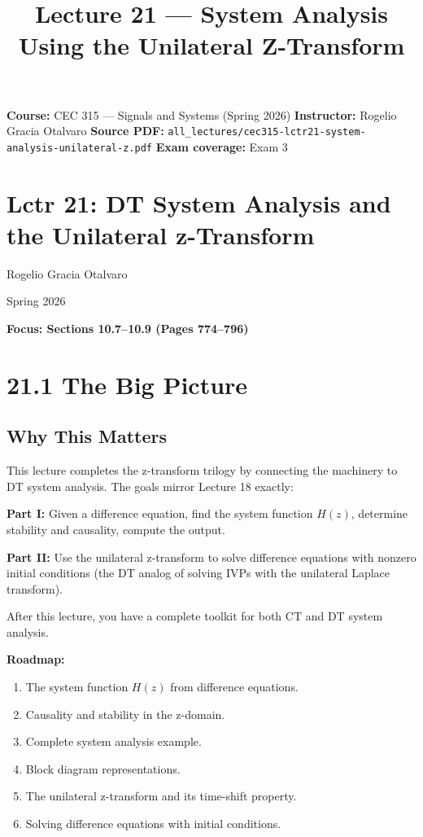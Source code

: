\documentclass[11pt]{article}
\title{Lecture 21 — System Analysis Using the Unilateral Z-Transform}
\author{}
\date{}
\begin{document}
\maketitle

\textbf{Course:} CEC 315 — Signals and Systems (Spring 2026)
\textbf{Instructor:} Rogelio Gracia Otalvaro
\textbf{Source PDF:} \texttt{all\_lectures/cec315-lctr21-system-analysis-unilateral-z.pdf}
\textbf{Exam coverage:} Exam 3

\section*{Lctr 21: DT System Analysis and the Unilateral z-Transform}

Rogelio Gracia Otalvaro

Spring 2026

\textbf{Focus: Sections 10.7–10.9 (Pages 774–796)}

\section*{21.1 The Big Picture}

\subsection*{Why This Matters}

This lecture completes the z-transform trilogy by connecting the machinery to DT system analysis. The goals mirror Lecture 18 exactly:

\textbf{Part I:} Given a difference equation, find the system function $H(z)$, determine stability and causality, compute the output.

\textbf{Part II:} Use the unilateral z-transform to solve difference equations with nonzero initial conditions (the DT analog of solving IVPs with the unilateral Laplace transform).

After this lecture, you have a complete toolkit for both CT and DT system analysis.

\textbf{Roadmap:}

\begin{enumerate}
  \item The system function $H(z)$ from difference equations.
  \item Causality and stability in the z-domain.
  \item Complete system analysis example.
  \item Block diagram representations.
  \item The unilateral z-transform and its time-shift property.
  \item Solving difference equations with initial conditions.
\end{enumerate}
\end{document}
